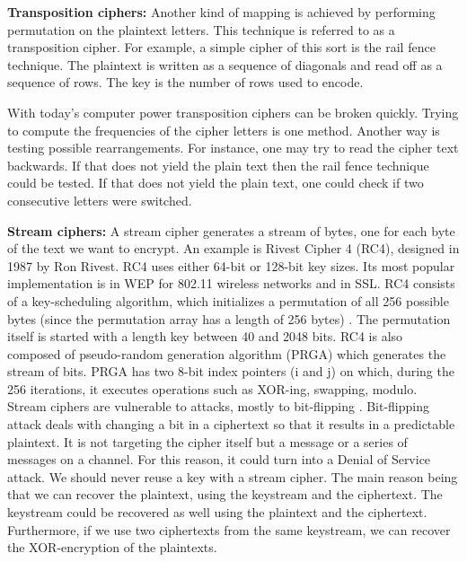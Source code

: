 \textbf{Transposition ciphers:} Another kind of mapping is achieved by performing permutation on the plaintext letters. This technique is referred to as a transposition cipher. For example, a simple cipher of this sort is the rail fence technique. The plaintext is written as a sequence of diagonals and read off as a sequence of rows. The key is the number of rows used to encode. 

With today's computer power transposition ciphers can be broken quickly. Trying to compute the frequencies of the cipher letters is one method. Another way is testing possible rearrangements. For instance, one may try to read the cipher text backwards. If that does not yield the plain text then the rail fence technique could be tested. If that does not yield the plain text, one could check if two consecutive letters were switched.    

\textbf{Stream ciphers:} A stream cipher generates a stream of bytes, one for each byte of the text we want to encrypt.  An example is Rivest Cipher 4 (RC4), designed in 1987 by Ron Rivest. RC4 uses either 64-bit or 128-bit key sizes. Its most popular implementation is in WEP for 802.11 wireless networks and in SSL. RC4 consists of a key-scheduling algorithm, which initializes a permutation of all 256 possible bytes (since the permutation array has a length of 256 bytes) \cite{stallings2017}. The permutation itself is started with a length key between 40 and 2048 bits. RC4 is also composed of pseudo-random generation algorithm (PRGA) which generates the stream of bits. PRGA has two 8-bit index pointers (i and j) on which, during the 256 iterations, it executes operations such as XOR-ing, swapping, modulo. Stream ciphers are vulnerable to attacks, mostly to bit-flipping \cite{wikirc4} . Bit-flipping attack deals with changing a bit in a ciphertext so that it results in a predictable plaintext. It is not targeting the cipher itself but a message or a series of messages on a channel. For this reason, it could turn into a Denial of Service attack. We should never reuse a key with a stream cipher. The main reason being that we can recover the plaintext, using the keystream and the ciphertext. The keystream could be recovered as well using the plaintext and the ciphertext. Furthermore, if we use two ciphertexts from the same keystream, we can recover the XOR-encryption of the plaintexts.

